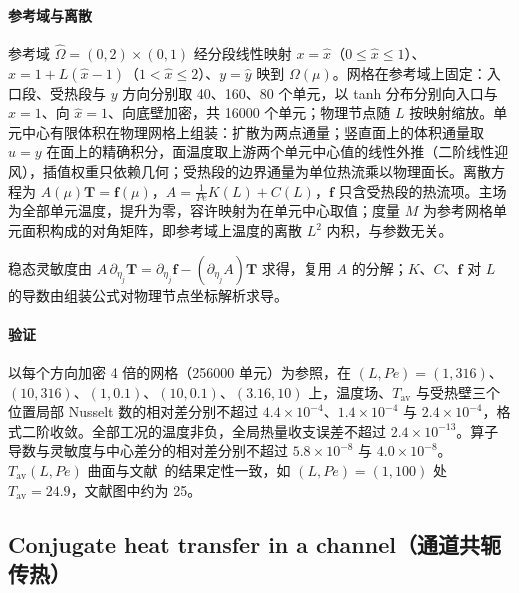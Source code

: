 \paragraph{参考域与离散}
参考域 $\hat\Omega=(0,2)\times(0,1)$ 经分段线性映射 $x=\hat x$（$0\le\hat x\le1$）、$x=1+L(\hat x-1)$（$1<\hat x\le2$）、$y=\hat y$ 映到 $\Omega(\mu)$。网格在参考域上固定：入口段、受热段与 $y$ 方向分别取 40、160、80 个单元，以 tanh 分布分别向入口与 $\hat x=1$、向 $\hat x=1$、向底壁加密，共 16000 个单元；物理节点随 $L$ 按映射缩放。单元中心有限体积在物理网格上组装：扩散为两点通量；竖直面上的体积通量取 $u=y$ 在面上的精确积分，面温度取上游两个单元中心值的线性外推（二阶线性迎风），插值权重只依赖几何；受热段的边界通量为单位热流乘以物理面长。离散方程为 $A(\mu)\mathbf T=\mathbf f(\mu)$，$A=\tfrac1{Pe}K(L)+C(L)$，$\mathbf f$ 只含受热段的热流项。主场为全部单元温度，提升为零，容许映射为在单元中心取值；度量 $M$ 为参考网格单元面积构成的对角矩阵，即参考域上温度的离散 $L^2$ 内积，与参数无关。

稳态灵敏度由 $A\,\partial_{\eta_j}\mathbf T=\partial_{\eta_j}\mathbf f-(\partial_{\eta_j}A)\mathbf T$ 求得，复用 $A$ 的分解；$K$、$C$、$\mathbf f$ 对 $L$ 的导数由组装公式对物理节点坐标解析求导。

\paragraph{验证}
以每个方向加密 4 倍的网格（256000 单元）为参照，在 $(L,Pe)=(1,316)$、$(10,316)$、$(1,0.1)$、$(10,0.1)$、$(3.16,10)$ 上，温度场、$T_{\mathrm{av}}$ 与受热壁三个位置局部 Nusselt 数的相对差分别不超过 $4.4\times10^{-4}$、$1.4\times10^{-4}$ 与 $2.4\times10^{-4}$，格式二阶收敛。全部工况的温度非负，全局热量收支误差不超过 $2.4\times10^{-13}$。算子导数与灵敏度与中心差分的相对差分别不超过 $5.8\times10^{-8}$ 与 $4.0\times10^{-8}$。$T_{\mathrm{av}}(L,Pe)$ 曲面与文献~\cite{quarteroni2011certified}的结果定性一致，如 $(L,Pe)=(1,100)$ 处 $T_{\mathrm{av}}=24.9$，文献图中约为 25。

\subsection{Conjugate heat transfer in a channel（通道共轭传热）}
\label{app:conjugate}

